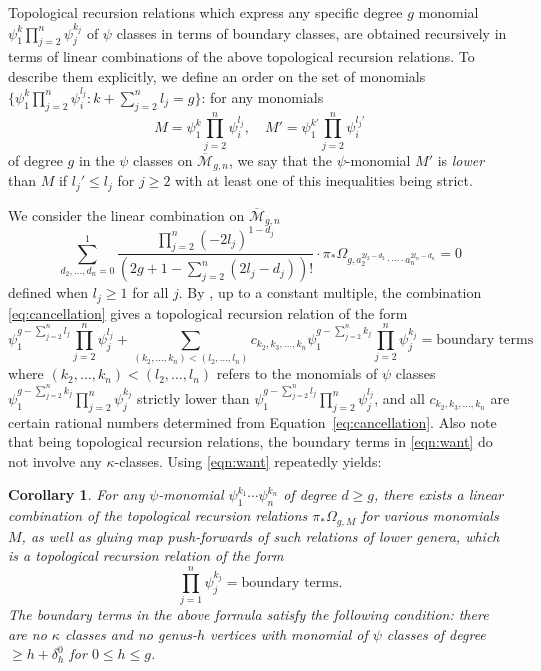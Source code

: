 \documentclass[12pt,reqno]{amsart}
\theoremstyle{plain}
\newtheorem{corollary}[theorem]{Corollary}
\theoremstyle{definition}
\theoremstyle{remark}
\begin{document}
\medskip

Topological recursion relations which express any specific degree $g$
monomial $\psi_1^k \prod_{j=2}^n\psi_j^{k_j}$ of $\psi$ classes in terms of
boundary classes, are obtained recursively in terms of linear combinations of
the above topological recursion relations.
To describe them explicitly, we define an order on the set of monomials
$\{\psi_1^k \prod_{j=2}^n \psi_i^{l_j}: 
k+\sum_{j=2}^{n}l_j=g\}$: for any monomials
\begin{equation}
\label{eq:psimon}
M=\psi_1^k \prod_{j=2}^n \psi_i^{l_j},\quad M'=\psi_1^{k'} \prod_{j=2}^{n} \psi_i^{l_j'}
\end{equation}
of degree $g$ in the $\psi$ classes on $\overline{\mathcal{M}}_{g,n}$,
we say that the $\psi$-monomial $M'$ is \emph{lower} than
$M$ if  $l_j' \le l_j$ for $j \ge 2$ with at
least one of this inequalities being strict.

We consider the linear combination on $\overline{\mathcal{M}}_{g,n}$
\begin{equation}
  \label{eq:cancellation}
  \sum_{d_2, \dotsc, d_n = 0}^1
  \frac{\prod_{j = 2}^n (-2l_j)^{1 - d_j}}{(2g + 1 - \sum_{j=2}^{n} (2l_j - d_j))!} \cdot \pi_* \Omega_{g, a_2^{2l_2 - d_2} \cdot \dotsb \cdot a_n^{2l_n - d_n}}=0
\end{equation}
defined when $l_j \ge 1$ for all $j$.
By \cite[Proposition~13]{clader2023topological}, up to a constant multiple, the
combination \eqref{eq:cancellation} gives a topological recursion
relation of the form
\begin{equation}
\label{eqn:want}
\psi_1^{g-\sum_{j=2}^{n} l_j} \prod_{j=2}^n \psi_j^{l_j}
+\sum_{(k_2,\dots,k_n)<(l_2,\dots,l_n)}c_{k_2,k_3,\dots,k_n}\psi_1^{g-\sum_{j=2}^{n}k_j} \prod_{j=2}^n \psi_j^{k_j}=\text{boundary terms}
\end{equation}
where $(k_2,\dots,k_n)<(l_2,\dots,l_n)$ refers to the monomials of $\psi$ classes $\psi_1^{g-\sum_{j=2}^{n}k_j}\prod_{j=2}^{n}\psi_j^{k_j}$ strictly lower than  $\psi_1^{g-\sum_{j=2}^{n}l_j}\prod_{j=2}^{n}\psi_j^{l_j}$, and all $c_{k_2,k_3,\dots,k_n}$ are certain rational numbers determined from Equation~\eqref{eq:cancellation}.
Also note that being topological recursion relations, the boundary terms in \eqref{eqn:want} do not involve any $\kappa$-classes.
Using \eqref{eqn:want} repeatedly yields:
\begin{corollary}\label{cor:deg-d-TRR-uniform}
  For any $\psi$-monomial $\psi_1^{k_1} \cdots \psi_n^{k_n}$ of degree $d \ge g$, there exists a linear combination of the topological recursion relations $\pi_* \Omega_{g, M}$ for various monomials $M$, as well as gluing map push-forwards of such relations of lower genera, which is a topological recursion relation of the form
  \begin{equation*}
    \prod_{j=1}^n \psi_j^{k_j} = \text{boundary terms}.
  \end{equation*}
  The boundary terms in the above formula satisfy the following condition: there are no $\kappa$ classes and no genus-$h$ vertices with monomial of $\psi$ classes of degree $\geq h+\delta_{h}^0$ for $0\leq h\leq g$.
\end{corollary}
\end{document}
